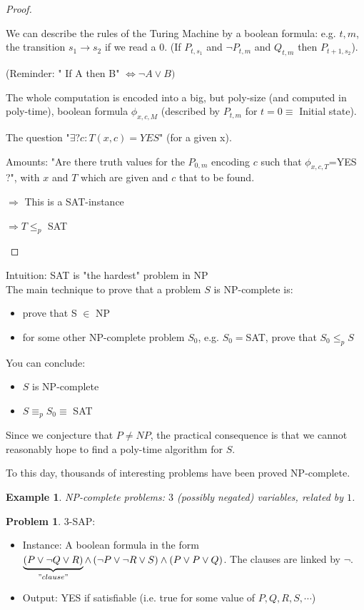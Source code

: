 \documentclass[11pt]{report}
\newtheorem{example}{Example}
\theoremstyle{definition}
\newtheorem{definition}{Problem}
\theoremstyle{remark}
\begin{document}
\begin{proof}
\begin{itemize}
 We can describe the rules of the Turing Machine by a boolean formula: e.g. $t,m$, the transition $s_1 \longrightarrow s_2$ if we read a $0$. (If $P_{t,s_1}$ and $\neg P_{t,m}$ and $Q_{t,m}$ then $P_{t+1,s_2}$).
 
(Reminder: " If A then B" $\Leftrightarrow \neg A \vee B)$ 

The whole computation is encoded into a big, but poly-size (and computed in poly-time), boolean formula $\phi_{x,c,M}$ (described by $P_{t,m}$ for $t=0\equiv$ Initial state). 

The question "$\exists ? c: T(x,c)=YES$" (for a given x). 

Amounts: "Are there truth values for the $P_{0,m}$ encoding $c$ such that $\phi_{x,c,T}$=YES ?", with $x$ and $T$ which are given and $c$ that to be found. 

$\Rightarrow$ This is a SAT-instance 

$\Rightarrow T \leq_{p} $ SAT
\end{itemize} 
\end{proof}

Intuition: SAT is "the hardest" problem in NP \\
The main technique to prove that a problem $S$ is NP-complete is:
\begin{itemize}
\item prove that S $\in$ NP
\item for some other NP-complete problem $S_0$, e.g. $S_0=$SAT, prove that $S_0 \leq_p S$
\end{itemize}
You can conclude:
\begin{itemize}
\item $S$ is NP-complete
\item $S \equiv_p S_0 \equiv$ SAT
\end{itemize}
Since we conjecture that $P\neq NP$, the practical consequence is that we cannot reasonably hope to find a poly-time algorithm for $S$. 
 
To this day, thousands of interesting problems have been proved NP-complete.

\begin{example}
NP-complete problems: $3$ (possibly negated) variables, related by $1$.
\end{example}

\begin{definition}
3-SAP:
\begin{itemize}
\item Instance: A boolean formula in the form $\underbrace{\left( P \vee \neg Q \vee R \right)}_{"clause"} \wedge \left( \neg P \vee \neg R \vee S \right) \wedge \left( P \vee P  \vee Q \right)$. The clauses are linked by $\neg$.
\item Output: YES if satisfiable (i.e. true for some value of $P,Q,R,S,\cdots$) 
\end{itemize}
\end{definition}
\end{document}
